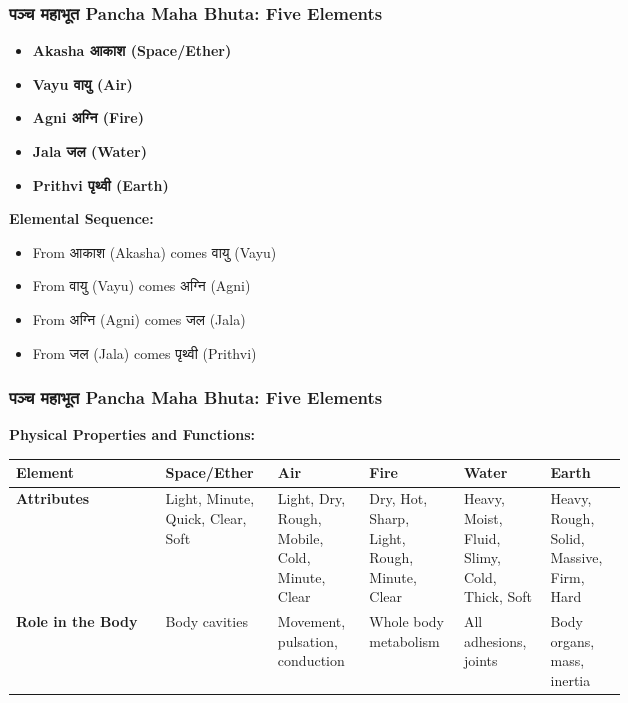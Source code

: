 \begin{frame}[fragile]\frametitle{पञ्च  महाभूत  Pancha Maha Bhuta: Five Elements}


    \begin{itemize}
        \item \textbf{Akasha आकाश  (Space/Ether)}
        \item \textbf{Vayu वायु  (Air)}
        \item \textbf{Agni अग्नि (Fire)}
        \item \textbf{Jala जल (Water)}
        \item \textbf{Prithvi पृथ्वी (Earth)}
    \end{itemize}
	
    \textbf{Elemental Sequence:}
	
    \begin{itemize}
        \item From आकाश (Akasha) comes वायु (Vayu)
        \item From वायु (Vayu) comes अग्नि (Agni)
        \item From अग्नि (Agni) comes जल (Jala)
        \item From जल (Jala) comes पृथ्वी (Prithvi)
    \end{itemize}
	
\end{frame}

\begin{frame}[fragile]\frametitle{पञ्च  महाभूत   Pancha Maha Bhuta: Five Elements}

    \textbf{Physical Properties and Functions:}
	
	
        \begin{tabular}{|p{0.21\linewidth}|p{0.1\linewidth}|p{0.1\linewidth}|p{0.1\linewidth}|p{0.1\linewidth}|p{0.1\linewidth}|}
    \hline
    \textbf{Element} & \textbf{Space/Ether} & \textbf{Air} & \textbf{Fire} & \textbf{Water} & \textbf{Earth} \\
    \hline
    \textbf{Attributes} & Light, Minute, Quick, Clear, Soft & Light, Dry, Rough, Mobile, Cold, Minute, Clear & Dry, Hot, Sharp, Light, Rough, Minute, Clear & Heavy, Moist, Fluid, Slimy, Cold, Thick, Soft & Heavy, Rough, Solid, Massive, Firm, Hard \\
    \hline
    \textbf{Role in the Body} & Body cavities & Movement, pulsation, conduction & Whole body metabolism & All adhesions, joints & Body organs, mass, inertia \\
    \hline
    \end{tabular}

\end{frame}


